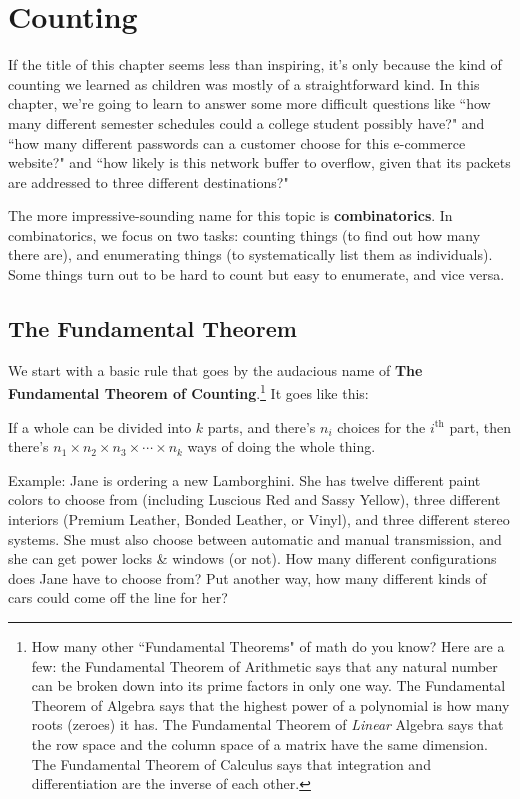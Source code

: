 
\chapter{Counting}

If the title of this chapter seems less than inspiring, it's only because
the kind of counting we learned as children was mostly of a straightforward
kind. In this chapter, we're going to learn to answer some more difficult
questions like ``how many different semester schedules could a college
student possibly have?" and ``how many different passwords can a
customer choose for this e-commerce website?" and ``how likely is this
network buffer to overflow, given that its packets are addressed to three
different destinations?"

\smallskip
The more impressive-sounding name for this topic is \textbf{combinatorics}.
In combinatorics, we focus on two tasks: counting things (to find out how
many there are), and enumerating things (to systematically list them as
individuals). Some things turn out to be hard to count but easy to
enumerate, and vice versa.
\bigskip
\bigskip
\bigskip

\pagebreak
\section{The Fundamental Theorem}

We start with a basic rule that goes by the audacious name of \textbf{The
Fundamental Theorem of Counting}.\footnote{How many other ``Fundamental
Theorems" of math do you know? Here are a few: the Fundamental Theorem of
Arithmetic says that any natural number can be broken down into its prime
factors in only one way. The Fundamental Theorem of Algebra says that the
highest power of a polynomial is how many roots (zeroes) it has. The
Fundamental Theorem of \textit{Linear} Algebra says that the row space and the
column space of a matrix have the same dimension. The Fundamental Theorem of
Calculus says that integration and differentiation are the inverse of each
other.} It goes like this:

\begin{framed}
If a whole can be divided into $k$ parts, and
there's $n_i$ choices for the $i^{\text{th}}$ part, then there's $n_1
\times n_2 \times n_3 \times \cdots \times n_k$ ways of doing the whole
thing.
\end{framed}


Example: Jane is ordering a new Lamborghini. She has twelve different
paint colors to choose from (including Luscious Red and Sassy Yellow),
three different interiors (Premium Leather, Bonded Leather, or Vinyl), and
three different stereo systems. She must also choose between automatic and
manual transmission, and she can get power locks \& windows (or not). How
many different configurations does Jane have to choose from? Put another
way, how many different kinds of cars could come off the line for her?

